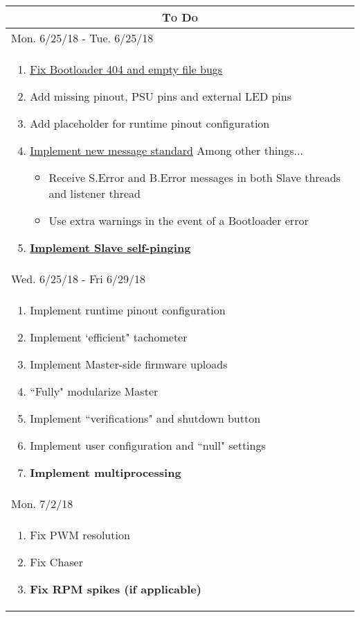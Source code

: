 \documentclass{article}
\begin{document}
\begin{center}
\renewcommand{\labelitemi}{-}
\begin{longtable}{| p{} |}
\hline
\multicolumn{1}{|c|}{\textsc{To Do}}\\*
\hline
\multicolumn{1}{|l|}{Mon. 6/25/18 - Tue. 6/25/18}\\*
\hline
\begin{enumerate}
	\item \underline{Fix Bootloader 404 and empty file bugs}
	\item Add missing pinout, PSU pins and external LED pins
	\item Add placeholder for runtime pinout configuration
	\item \underline{Implement new message standard}
		\linebreak\indent Among other things...
		\begin{itemize}
			\item Receive S.Error and B.Error messages in both Slave threads
				and listener thread
			\item Use extra warnings in the event of a Bootloader error
		\end{itemize}
	\item \textbf{\underline{Implement Slave self-pinging}}
\end{enumerate}\\
\hline
\multicolumn{1}{|l|}{Wed. 6/25/18 - Fri 6/29/18}\\*
\hline
\begin{enumerate}
	\item Implement runtime pinout configuration
	\item Implement `efficient" tachometer
	\item Implement Master-side firmware uploads
	\item ``Fully" modularize Master
	\item Implement ``verifications" and shutdown button
	\item Implement user configuration and ``null" settings
	\item \textbf{Implement multiprocessing}
\end{enumerate}\\
\hline
\multicolumn{1}{|l|}{Mon. 7/2/18}\\*
\hline
\begin{enumerate}
	\item Fix PWM resolution
	\item Fix Chaser
	\item \textbf{Fix RPM spikes (if applicable)}

\end{enumerate}
\end{longtable}
\end{center}
\end{document}
